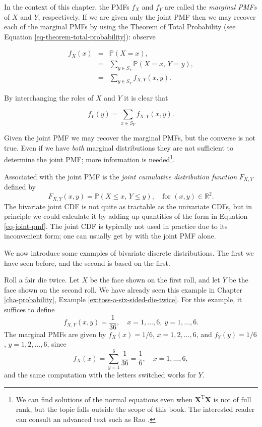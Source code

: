 \documentclass[]{book}
\let\rmarkdownfootnote\footnote%
\def\footnote{\protect\rmarkdownfootnote}
\numberwithin{equation}{chapter}
\numberwithin{figure}{chapter}
\theoremstyle{plain}
\theoremstyle{definition}
\theoremstyle{remark}
\theoremstyle{definition}
\theoremstyle{definition}
\theoremstyle{remark}
\let\BeginKnitrBlock\begin \let\EndKnitrBlock\end
\begin{document}
In the context of this chapter, the PMFs \(f_{X}\) and \(f_{Y}\) are
called the \emph{marginal PMFs} of \(X\) and \(Y\), respectively. If we
are given only the joint PMF then we may recover each of the marginal
PMFs by using the Theorem of Total Probability (see Equation
\eqref{eq-theorem-total-probability}): observe

\begin{eqnarray}
f_{X}(x) & = & \mathbb{P}(X=x),\\
 & = & \sum_{y\in S_{Y}}\mathbb{P}(X=x,\, Y=y),\\
 & = & \sum_{y\in S_{Y}}f_{X,Y}(x,y).
\end{eqnarray}

By interchanging the roles of \(X\) and \(Y\) it is clear that

\begin{equation}
\label{eq-marginal-pmf}
f_{Y}(y)=\sum_{x\in S_{Y}}f_{X,Y}(x,y).
\end{equation}

Given the joint PMF we may recover the marginal PMFs, but the converse
is not true. Even if we have \emph{both} marginal distributions they are
not sufficient to determine the joint PMF; more information is
needed\footnote{We can find solutions of the normal equations even when
  \(\mathbf{X}^{\mathrm{T}}\mathbf{X}\) is not of full rank, but the
  topic falls outside the scope of this book. The interested reader can
  consult an advanced text such as Rao \autocite{Rao1999}.}.

Associated with the joint PMF is the \emph{joint cumulative distribution
function} \(F_{X,Y}\) defined by \[ F_{X,Y}(x,y)=\mathbb{P}(X\leq x,\,
Y\leq y),\quad \mbox{for }(x,y)\in\mathbb{R}^{2}.  \] The bivariate
joint CDF is not quite as tractable as the univariate CDFs, but in
principle we could calculate it by adding up quantities of the form in
Equation \eqref{eq-joint-pmf}. The joint CDF is typically not used in
practice due to its inconvenient form; one can usually get by with the
joint PMF alone.

We now introduce some examples of bivariate discrete distributions. The
first we have seen before, and the second is based on the first.

\bigskip

\BeginKnitrBlock{example}
\protect\hypertarget{ex:toss-two-dice-joint-pmf}{}{\label{ex:toss-two-dice-joint-pmf}}Roll
a fair die twice. Let \(X\) be the face shown on the first roll, and let
\(Y\) be the face shown on the second roll. We have already seen this
example in Chapter \ref{cha-probability}, Example
\ref{ex:toss-a-six-sided-die-twice}. For this example, it suffices to
define \[ f_{X,Y}(x,y)=\frac{1}{36},\quad
x=1,\ldots,6,\ y=1,\ldots,6.  \] The marginal PMFs are given by
\(f_{X}(x)=1/6\), \(x=1,2,\ldots,6\), and \(f_{Y}(y)=1/6\),
\(y=1,2,\ldots,6\), since \[
f_{X}(x)=\sum_{y=1}^{6}\frac{1}{36}=\frac{1}{6},\quad x=1,\ldots,6, \]
and the same computation with the letters switched works for \(Y\).
\EndKnitrBlock{example}
\end{document}
